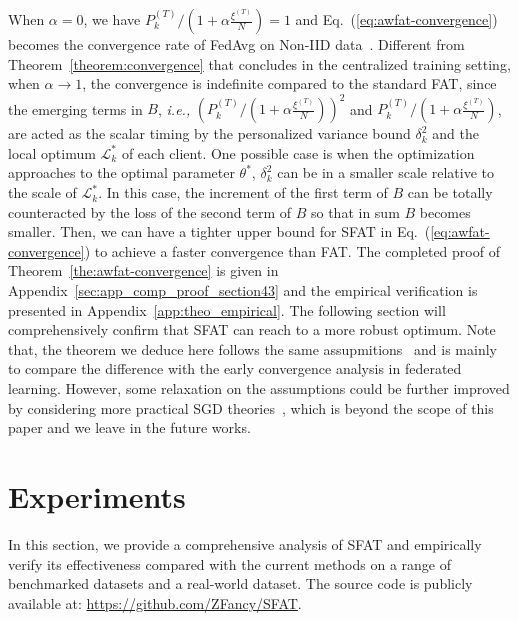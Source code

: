 \documentclass{article} %
\theoremstyle{plain}
\theoremstyle{definition}
\theoremstyle{remark}
\begin{document}
When $\alpha=0$, we have 
$P_k^{(T)}\slash(1+\alpha\frac{\xi^{(T)}}{N})=1$
and Eq.~(\ref{eq:awfat-convergence}) becomes the convergence rate of FedAvg on Non-IID data~\citep{li2019convergence}. Different from Theorem~\ref{theorem:convergence} that concludes in the centralized training setting, when $\alpha\rightarrow1$, the convergence is indefinite compared to the standard FAT, since the emerging terms in $B$, \textit{i.e.,} $\left(P_k^{(T)}\slash(1+\alpha\frac{\xi^{(T)}}{N})\right)^2$ and $P_k^{(T)}\slash(1+\alpha\frac{\xi^{(T)}}{N})$, are acted as the scalar timing by the personalized variance bound $\delta_k^2$ and the local optimum $\mathcal{L}^*_k$ of each client. One possible case is when the optimization approaches to the optimal parameter $\theta^*$, $\delta_k^2$ can be in a smaller scale relative to the scale of $\mathcal{L}^*_k$. In this case, the increment of the first term of $B$ can be totally counteracted by the loss of the second term of $B$ so that in sum $B$ becomes smaller. Then, we can have a tighter upper bound for SFAT in Eq.~(\ref{eq:awfat-convergence}) to achieve a faster convergence than FAT. The completed proof of Theorem~\ref{the:awfat-convergence} is given in Appendix~\ref{sec:app_comp_proof_section43} and the empirical verification is presented in Appendix~\ref{app:theo_empirical}. The following section will comprehensively confirm that SFAT can reach to a more robust optimum. Note that, the theorem we deduce here follows the same assupmitions~\citep{li2019convergence} and is mainly to compare the difference with the early convergence analysis in federated learning. However, some relaxation on the assumptions could be further improved by considering more practical SGD theories~\citep{nguyen2018sgd}, which is beyond the scope of this paper and we leave in the future works.



\section{Experiments}
\label{sec:exp}

In this section, we provide a comprehensive analysis of SFAT and empirically verify its effectiveness compared with the current methods on a range of benchmarked datasets and a real-world dataset. The source code is publicly available at: \url{https://github.com/ZFancy/SFAT}.
\end{document}
